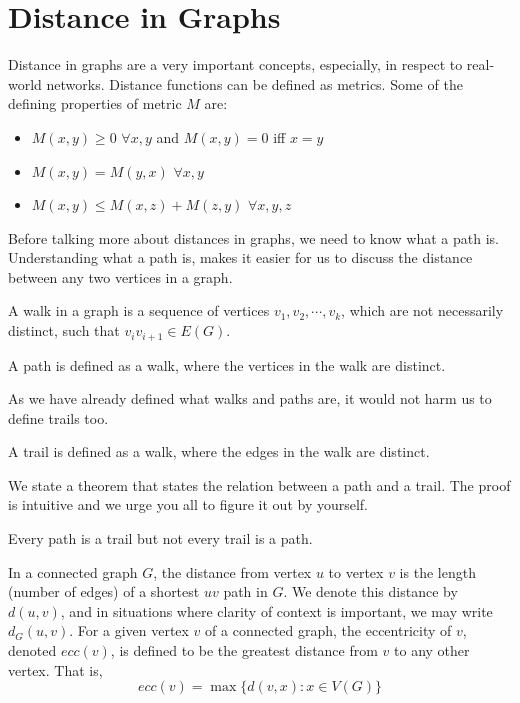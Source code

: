 \chapter{Distance in Graphs}

Distance in graphs are a very important concepts, especially, in respect to real-world networks. Distance functions can be defined as metrics. Some of the defining properties of metric $M$ are:
\begin{itemize}
    \item $M(x,y) \ge 0$ $\forall x,y$ and $M(x,y)=0$ iff $x=y$
    \item $M(x,y)=M(y,x)$ $\forall x,y$
    \item $M(x,y) \le M(x,z)+M(z,y)$ $\forall x,y,z$
\end{itemize}

Before talking more about distances in graphs, we need to know what a path is. Understanding what a path is, makes it easier for us to discuss the distance between any two vertices in a graph.

\begin{defn}
    A walk in a graph is a sequence of vertices $v_1, v_2,\cdots, v_k$, which are not necessarily distinct, such that $v_iv_{i+1} \in E(G)$.
\end{defn}
\begin{defn}
    A path is defined as a walk, where the vertices in the walk are distinct.
\end{defn}

As we have already defined what walks and paths are, it would not harm us to define trails too.

\begin{defn}
    A trail is defined as a walk, where the edges in the walk are distinct.
\end{defn}

We state a theorem that states the relation between a path and a trail. The proof is intuitive and we urge you all to figure it out by yourself.

\begin{thm}
    Every path is a trail but not every trail is a path.
\end{thm}

In a connected graph $G$, the distance from vertex $u$ to vertex $v$ is the length (number of edges) of a shortest $uv$ path in $G$. We denote this distance by $d(u,v)$, and in situations where clarity of context is important, we may write $d_G(u,v)$.
For a given vertex $v$ of a connected graph, the eccentricity of $v$, denoted $ecc(v)$, is defined to be the greatest distance from $v$ to any other vertex. That is,\\
\begin{equation*}
    ecc(v)=\max \{d(v,x):x \in V(G)\}
\end{equation*}

